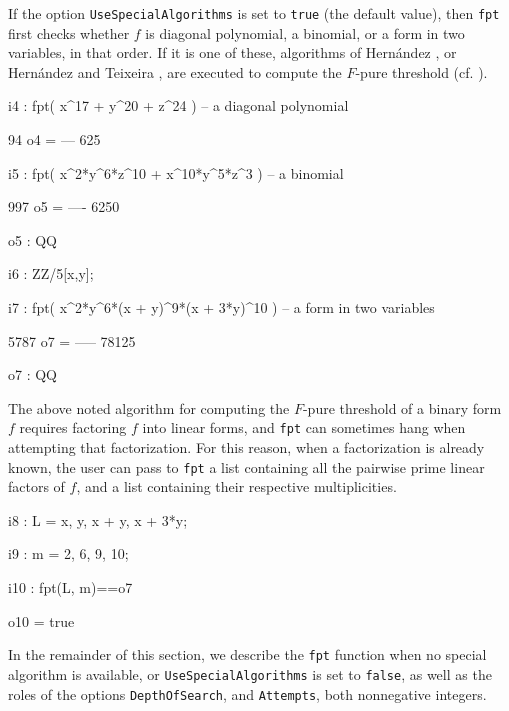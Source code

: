 \documentclass{amsart}
\begin{document}
             If the option {\tt UseSpecialAlgorithms} is set to {\tt true} (the default value), then {\tt fpt} first checks whether $f$ is diagonal polynomial, a binomial, or a form in two variables, in that order.
             If it is one of these, algorithms of Hern\'andez \cite{HernandezFInvariantsOfDiagonalHyp, HernandezFPureThresholdOfBinomial}, or Hern\'andez and Teixeira \cite{HernandezTeixeiraFThresholdFunctions},  are executed to compute the $F$-pure threshold (cf. \cite{ShibutaTakagiLCThresholds}).

{\small
{}
\begin{MyVerbatim}

i4 : fpt( x^17 + y^20 + z^24 ) -- a diagonal polynomial

      94
o4 = ---
     625

i5 : fpt( x^2*y^6*z^10 + x^10*y^5*z^3 ) -- a binomial

      997
o5 = ----
     6250

o5 : QQ

i6 : ZZ/5[x,y];

i7 : fpt( x^2*y^6*(x + y)^9*(x + 3*y)^10 ) -- a form in two variables

      5787
o7 = -----
     78125

o7 : QQ

\end{MyVerbatim}
}

            The above noted algorithm for computing the $F$-pure threshold of a binary form $f$ requires factoring $f$ into linear forms, and {\tt fpt} can sometimes hang when attempting that factorization. For this reason, when a factorization is already known, the user can pass to {\tt fpt} a list containing all the pairwise prime linear factors of $f$, and a list containing their respective multiplicities.

{\small
{}
\begin{MyVerbatim}

i8 : L = {x, y, x + y, x + 3*y};

i9 : m = {2, 6, 9, 10};

i10 : fpt(L, m)==o7

o10 = true

\end{MyVerbatim}
}

In the remainder of this section, we describe the {\tt fpt} function when no special algorithm is available, or {\tt UseSpecialAlgorithms} is set to {\tt false},  as well as the roles of the options {\tt DepthOfSearch}, and {\tt Attempts}, both nonnegative integers.
\end{document}
